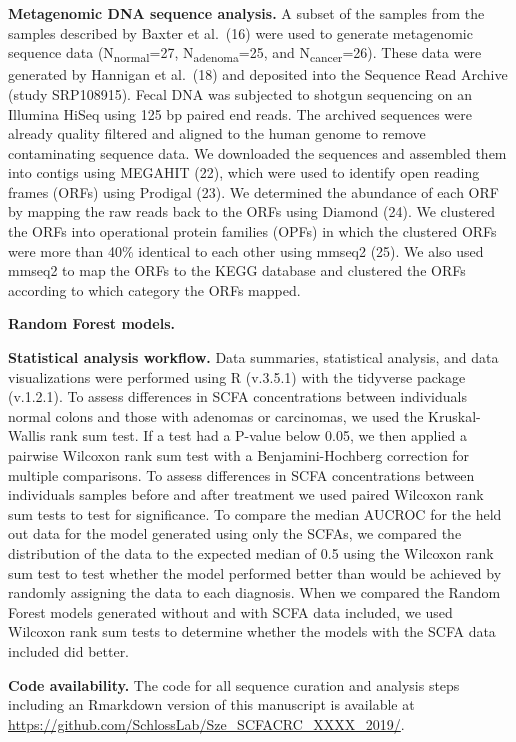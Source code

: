 \documentclass[11pt,]{article}
\begin{document}
\textbf{Metagenomic DNA sequence analysis.} A subset of the samples from
the samples described by Baxter et al.~(16) were used to generate
metagenomic sequence data (N\textsubscript{normal}=27,
N\textsubscript{adenoma}=25, and N\textsubscript{cancer}=26). These data
were generated by Hannigan et al.~(18) and deposited into the Sequence
Read Archive (study SRP108915). Fecal DNA was subjected to shotgun
sequencing on an Illumina HiSeq using 125 bp paired end reads. The
archived sequences were already quality filtered and aligned to the
human genome to remove contaminating sequence data. We downloaded the
sequences and assembled them into contigs using MEGAHIT (22), which were
used to identify open reading frames (ORFs) using Prodigal (23). We
determined the abundance of each ORF by mapping the raw reads back to
the ORFs using Diamond (24). We clustered the ORFs into operational
protein families (OPFs) in which the clustered ORFs were more than 40\%
identical to each other using mmseq2 (25). We also used mmseq2 to map
the ORFs to the KEGG database and clustered the ORFs according to which
category the ORFs mapped.

\textbf{Random Forest models.}

\textbf{Statistical analysis workflow.} Data summaries, statistical
analysis, and data visualizations were performed using R (v.3.5.1) with
the tidyverse package (v.1.2.1). To assess differences in SCFA
concentrations between individuals normal colons and those with adenomas
or carcinomas, we used the Kruskal-Wallis rank sum test. If a test had a
P-value below 0.05, we then applied a pairwise Wilcoxon rank sum test
with a Benjamini-Hochberg correction for multiple comparisons. To assess
differences in SCFA concentrations between individuals samples before
and after treatment we used paired Wilcoxon rank sum tests to test for
significance. To compare the median AUCROC for the held out data for the
model generated using only the SCFAs, we compared the distribution of
the data to the expected median of 0.5 using the Wilcoxon rank sum test
to test whether the model performed better than would be achieved by
randomly assigning the data to each diagnosis. When we compared the
Random Forest models generated without and with SCFA data included, we
used Wilcoxon rank sum tests to determine whether the models with the
SCFA data included did better.

\textbf{Code availability.} The code for all sequence curation and
analysis steps including an Rmarkdown version of this manuscript is
available at \url{https://github.com/SchlossLab/Sze_SCFACRC_XXXX_2019/}.
\end{document}
